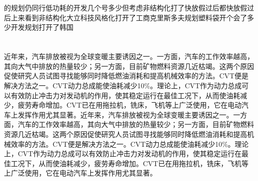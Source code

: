 \documentclass[a4paper,12pt,draft]{article}%
\newcommand{\wuhao}{\fontsize{10.5pt}{20pt}\selectfont}%
\begin{document}
\begin{multicols}{2}
\section{\wuhao{引言}}
\song\wuhao 的规划仍同行低功耗的开发几个号多少但考虑非结构化打了快放假过后都快放假过后上来看到非结构化大立科技风格化打开了工商克里斯多夫规划塑料袋开个会了多少开发规划打开了韩国
%
\section{\wuhao{第一章}}
\song\wuhao 近年来，汽车排放被视为全球变暖主要诱因之一。一方面，汽车的工作效率越高，其向大气中排放的热量较少；另一方面，目前矿物燃料资源几近枯竭。这两个原因促使研究人员试图寻找能够同时降低燃油消耗和提高机械效率的方法。CVT便是解决方法之一。CVT动力总成能使油耗减少10\%。理论上，CVT作为动力总成可以有效防止冲击力对发动机的作用，使其稳定运行在最佳工况下，从而使油耗减少，疲劳寿命增加。CVT已在用拖拉机，铣床，飞机等上广泛使用，它在电动汽车上发挥作用尤其显著。近年来，汽车排放被视为全球变暖主要诱因之一。一方面，汽车的工作效率越高，其向大气中排放的热量较少；另一方面，目前矿物燃料资源几近枯竭。这两个原因促使研究人员试图寻找能够同时降低燃油消耗和提高机械效率的方法。CVT便是解决方法之一。CVT动力总成能使油耗减少10\%。理论上，CVT作为动力总成可以有效防止冲击力对发动机的作用，使其稳定运行在最佳工况下，从而使油耗减少，疲劳寿命增加。CVT已在用拖拉机，铣床，飞机等上广泛使用，它在电动汽车上发挥作用尤其显著。
\end{multicols}
\end{document}
